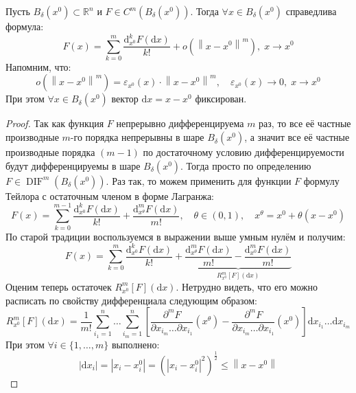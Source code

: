 \documentclass[11pt]{article}
\DeclareMathOperator{\DIF}{DIF}
\begin{document}
\begin{theorem}
    Пусть $B_{\delta}\left(x^0\right) \subset \mathbb{R}^n$ и  $F \in C^m \left(B_{\delta}\left(x^0\right)\right)$. Тогда $\forall x \in B_{\delta} \left(x^0\right)$ справедлива формула:
    \[F(x) = \sum_{k = 0}^m \frac{\mathrm{d}_{x^0}^k F (\mathrm{d} x)}{k!} + o \left(\left\lVert x - x^0 \right\rVert^m \right), \; x \to x^0\]
    Напомним, что: 
    \[o \left(\left\lVert x - x^0 \right\rVert^m \right) = \varepsilon_{x^0} (x) \cdot \left\lVert x - x^0 \right\rVert^m, \quad \varepsilon_{x^0} (x) \to 0, \; x \to x^0\]
    При этом $\forall x \in B_{\delta} \left(x^0\right)$ вектор $\mathrm{d} x = x - x^0$ фиксирован.
\end{theorem}

\begin{proof}
    Так как функция $F$ непрерывно дифференцируема $m$ раз, то все её частные производные $m$-го порядка непрерывны в шаре $B_{\delta} \left(x^0\right)$, а значит все её 
    частные производные порядка $(m - 1)$ по достаточному условию дифференцируемости будут дифференцируемы в шаре $B_{\delta} \left(x^0\right)$. Тогда просто по определению $F \in \DIF^m \left(B_{\delta}\left(x^0\right)\right)$. Раз так, то можем применить 
    для функции $F$ формулу Тейлора с остаточным членом в форме Лагранжа:
    \[F(x) = \sum_{k = 0}^{m - 1} \frac{\mathrm{d}_{x^0}^k F (\mathrm{d} x)}{k !} + \frac{\mathrm{d}_{x^{\theta}}^{m} F (\mathrm{d} x)}{m!}, \quad \theta \in (0, 1), \quad x^{\theta} = x^0 + \theta \left(x - x^0\right)\]
    По старой традиции воспользуемся в выражении выше умным нулём и получим:
    \[F(x) = \sum_{k = 0}^{m} \frac{\mathrm{d}_{x^0}^k F (\mathrm{d} x)}{k !} + \underbrace{\frac{\mathrm{d}_{x^{\theta}}^{m} F (\mathrm{d} x)}{m!} - \frac{\mathrm{d}_{x^0}^m F (\mathrm{d} x)}{m !}}_{R_{x^0}^m[F](\mathrm{d} x)}\]
    Оценим теперь остаточек $R_{x^0}^m[F](\mathrm{d} x)$. Нетрудно видеть, что его можно расписать по свойству дифференциала следующим образом:
    \begin{equation*} \label{remain:3.2} \tag{$\star$}
        R_{x^0}^m[F](\mathrm{d} x) = \frac{1}{m!} \sum_{i_1 = 1}^n \ldots \sum_{i_m = 1}^n \left[\frac{\partial^m F}{\partial x_{i_m} \ldots \partial x_{i_1}} \left(x^{\theta}\right) - \frac{\partial^m F}{\partial x_{i_m} \ldots \partial x_{i_1}} \left(x^0\right) \right] \mathrm{d} x_{i_1} \ldots \mathrm{d} x_{i_m}
    \end{equation*} 
    При этом $\forall i \in \{1, \ldots, m\}$ выполнено:
    \[\left\lvert \mathrm{d} x_i \right\rvert = \left\lvert x_i - x_i^0 \right\rvert = \left(\left\lvert x_i - x_i^0 \right\rvert^2\right)^{\frac{1}{2}} \leq \left\lVert x - x^0 \right\rVert \]

\end{proof}
\end{document}
